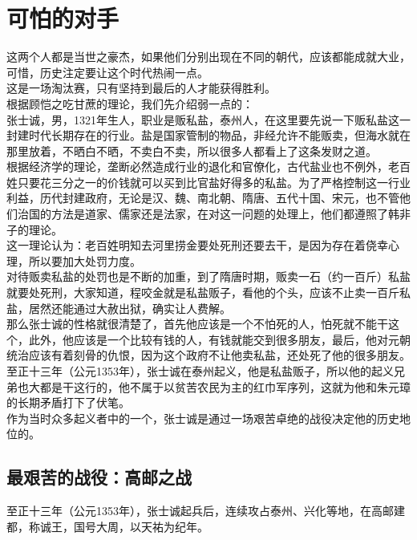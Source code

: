 \section{可怕的对手}
\ifnum{}
	\begin{multicols}{\theparacolNo}
\fi
这两个人都是当世之豪杰，如果他们分别出现在不同的朝代，应该都能成就大业，可惜，历史注定要让这个时代热闹一点。\\

这是一场淘汰赛，只有坚持到最后的人才能获得胜利。\\

根据顾恺之吃甘蔗的理论，我们先介绍弱一点的：\\

张士诚，男，1321年生人，职业是贩私盐，泰州人，在这里要先说一下贩私盐这一封建时代长期存在的行业。盐是国家管制的物品，非经允许不能贩卖，但海水就在那里放着，不晒白不晒，不卖白不卖，所以很多人都看上了这条发财之道。\\

根据经济学的理论，垄断必然造成行业的退化和官僚化，古代盐业也不例外，老百姓只要花三分之一的价钱就可以买到比官盐好得多的私盐。为了严格控制这一行业利益，历代封建政府，无论是汉、魏、南北朝、隋唐、五代十国、宋元，也不管他们治国的方法是道家、儒家还是法家，在对这一问题的处理上，他们都遵照了韩非子的理论。\\

这一理论认为：老百姓明知去河里捞金要处死刑还要去干，是因为存在着侥幸心理，所以要加大处罚力度。\\

对待贩卖私盐的处罚也是不断的加重，到了隋唐时期，贩卖一石（约一百斤）私盐就要处死刑，大家知道，程咬金就是私盐贩子，看他的个头，应该不止卖一百斤私盐，居然还能通过大赦出狱，确实让人费解。\\

那么张士诚的性格就很清楚了，首先他应该是一个不怕死的人，怕死就不能干这个，此外，他应该是一个比较有钱的人，有钱就能交到很多朋友，最后，他对元朝统治应该有着刻骨的仇恨，因为这个政府不让他卖私盐，还处死了他的很多朋友。\\

至正十三年（公元1353年），张士诚在泰州起义，他是私盐贩子，所以他的起义兄弟也大都是干这行的，他不属于以贫苦农民为主的红巾军序列，这就为他和朱元璋的长期矛盾打下了伏笔。\\

作为当时众多起义者中的一个，张士诚是通过一场艰苦卓绝的战役决定他的历史地位的。\\

\subsection{最艰苦的战役：高邮之战}
至正十三年（公元1353年），张士诚起兵后，连续攻占泰州、兴化等地，在高邮建都，称诚王，国号大周，以天祐为纪年。\\


\end{multicols}
